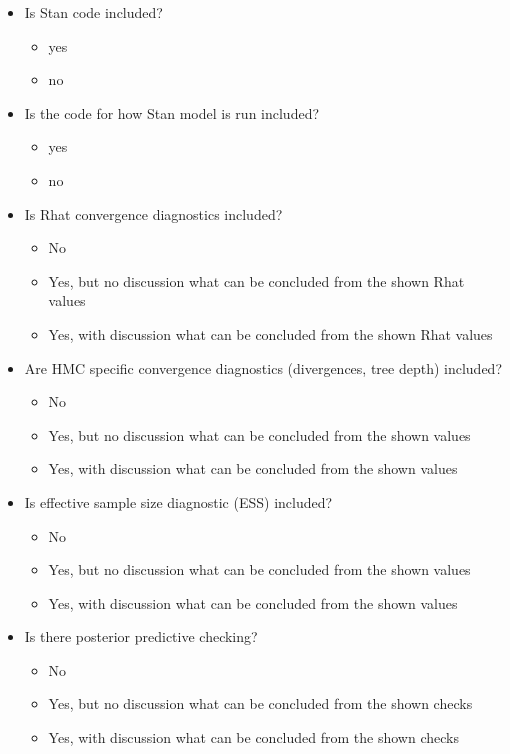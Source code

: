 \documentclass[a4paper,11pt]{article}
\begin{document}
\begin{itemize}
\item Is Stan code included?
  \begin{itemize}
  \item yes
  \item no
  \end{itemize}

  
\item Is the code for how Stan model is run included?
  \begin{itemize}
  \item yes
  \item no
  \end{itemize}

  \item Is Rhat convergence diagnostics included?
    \begin{itemize}
    \item No
    \item Yes, but no discussion what can be concluded from the shown Rhat values
    \item Yes, with discussion what can be concluded from the shown Rhat values
  \end{itemize}

  \item Are HMC specific convergence diagnostics (divergences, tree depth) included?
    \begin{itemize}
    \item No
    \item Yes, but no discussion what can be concluded from the shown values
    \item Yes, with discussion what can be concluded from the shown values
  \end{itemize}


  \item Is effective sample size diagnostic (ESS) included?
    \begin{itemize}
    \item No
    \item Yes, but no discussion what can be concluded from the shown values
    \item Yes, with discussion what can be concluded from the shown values
  \end{itemize}

\item Is there posterior predictive checking?
  \begin{itemize}
  \item No
  \item Yes, but no discussion what can be concluded from the shown checks
  \item Yes, with discussion what can be concluded from the shown checks
  \end{itemize}
  

\end{itemize}
\end{document}
